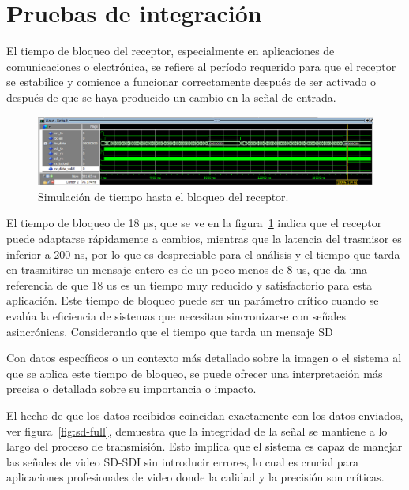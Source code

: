 \section{Pruebas de integración}


  El tiempo de bloqueo del receptor, especialmente en aplicaciones de
  comunicaciones o electrónica, se refiere al período requerido para que el
  receptor se estabilice y comience a funcionar correctamente después de ser
  activado o después de que se haya producido un cambio en la señal de entrada.

  \begin{figure}[h]
    \centering
    \includegraphics[width=1\textwidth]{./Figures/rx_lock_time.png}
    \caption{Simulación de tiempo hasta el bloqueo del receptor.}\label{fig:lock}
  \end{figure}

  El tiempo de bloqueo de 18 µs, que se ve en la figura~\ref{fig:lock} indica que el receptor puede adaptarse
  rápidamente a cambios, mientras que la latencia del trasmisor es inferior a 200 ns,
  por lo que es despreciable para el análisis y el tiempo que tarda en trasmitirse
  un mensaje entero es de un poco menos de 8 us, que da una referencia de que
  18 us es un tiempo muy reducido y satisfactorio para esta aplicación.
  Este tiempo de bloqueo puede ser un parámetro crítico
  cuando se evalúa la eficiencia de sistemas que necesitan sincronizarse con
  señales asincrónicas. Considerando que el tiempo que tarda un mensaje SD

  Con datos específicos o un contexto más detallado sobre la imagen o el
  sistema al que se aplica este tiempo de bloqueo, se puede ofrecer una interpretación
  más precisa o detallada sobre su importancia o impacto.

  El hecho de que los datos recibidos coincidan exactamente con los datos enviados,
  ver figura~\ref{fig:sd-full}, demuestra que la integridad de la señal se mantiene
  a lo largo del proceso de transmisión. Esto implica que el sistema es capaz de
  manejar las señales de video SD-SDI sin introducir errores, lo cual es crucial
  para aplicaciones profesionales de video donde la calidad y la precisión son críticas.

